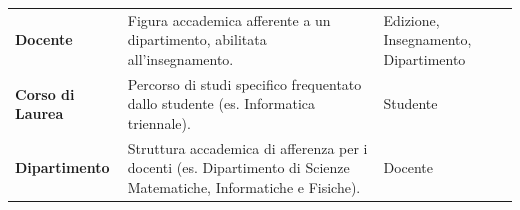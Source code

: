 \begin{longtable}{ >{\raggedright\arraybackslash}p{3.5cm} >{\raggedright\arraybackslash}p{7.5cm} >{\raggedright\arraybackslash}p{3.5cm}}
    \textbf{Docente} & Figura accademica afferente a un dipartimento, abilitata all'insegnamento. & Edizione, Insegnamento, Dipartimento \\

    \textbf{Corso di Laurea} & Percorso di studi specifico frequentato dallo studente (es. Informatica triennale). & Studente \\

    \textbf{Dipartimento} & Struttura accademica di afferenza per i docenti (es. Dipartimento di Scienze Matematiche, Informatiche e Fisiche). & Docente \\

\end{longtable}